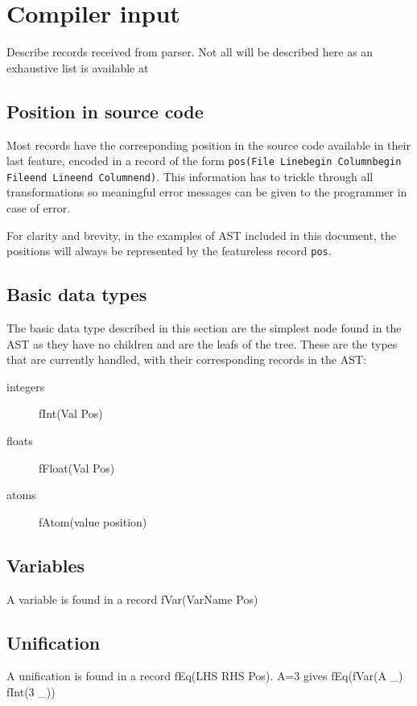 \documentclass[a4paper]{memoir}
\begin{document}
\section{Compiler input}\label{section:compilerinput}
Describe records received from parser.
Not all will be described here as an exhaustive list is available at %
\subsection{Position in source code}
Most records have the corresponding position in the source code available in their last feature, encoded in a record of the form \lstinline!pos(File Linebegin Columnbegin Fileend Lineend Columnend)!. This information has to trickle through all transformations so meaningful error messages can be given to the programmer in case of error.

For clarity and brevity, in the examples of AST included in this document, the positions will always be represented by the featureless record \lstinline!pos!. 
\subsection{Basic data types}
The basic data type described in this section are the simplest node found in the AST as they have no children and are the leafs of the tree.
These are the types that are currently handled, with their corresponding records in the AST:
\begin{description}
  \item[integers] fInt(Val Pos)
  \item[floats] fFloat(Val Pos)
  \item[atoms] fAtom(value position)
\end{description}

\subsection{Variables}\label{sec:input:variables}
A variable is found in a record fVar(VarName Pos)

\subsection{Unification}
A unification is found in a record fEq(LHS RHS Pos).
A=3 gives fEq(fVar(A \_) fInt(3 \_))
\end{document}
